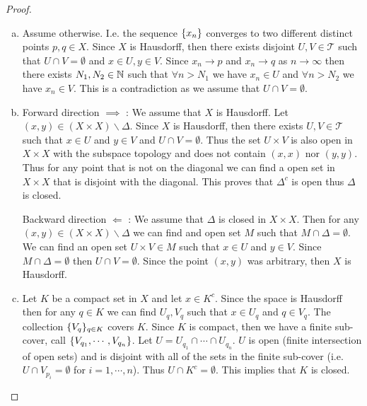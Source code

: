 \begin{proof}
	\begin{enumerate}[(a)]
		\item Assume otherwise. I.e. the sequence $ \{x_n\} $ converges to two different distinct points $ p,q \in X $. Since $ X $ is Hausdorff, then there exists disjoint $ U,V \in \mathcal{T} $ such that $ U\cap V = \emptyset $ and $ x \in U, y\in V $. Since $ x_n \to p $ and $ x_n \to q $ as $ n\to \infty $ then there exists $ N_1,N_2 \in \mathbb{N} $ such that $ \forall n > N_1 $ we have $ x_n \in U $ and $ \forall n > N_2 $ we have $ x_n \in V $. This is a contradiction as we assume that $ U\cap V = \emptyset $.
		
		\item Forward direction $ \boxed{\implies} $ : We assume that $ X $ is Hausdorff. Let $ (x,y) \in (X\times X) \backslash \Delta $. Since $ X $  is Hausdorff, then there exists $ U,V \in \mathcal{T} $ such that $ x \in U $ and $ y \in V $ and $ U\cap V = \emptyset $. Thus the set $ U\times V $ is also open in $ X\times X $  with the subspace topology and does not contain $ (x,x) $ nor $ (y,y) $. Thus for any point that is not on the diagonal we can find a open set in $ X\times X $ that is disjoint with the diagonal. This proves that $ \Delta^c $ is open thus $ \Delta  $ is closed.
		
		\noindent Backward direction $ \boxed{\Longleftarrow} $ : We assume that $ \Delta  $ is closed in $ X\times X $. Then for any $ (x,y) \in (X\times X) \backslash \Delta  $ we can find and open set $ M $ such that $ M\cap \Delta = \emptyset $. We can find an open set $ U\times V \in M $ such that $ x \in U $ and $ y \in V $. Since $ M \cap \Delta = \emptyset $ then $ U \cap V = \emptyset $. Since the point $ (x,y) $ was arbitrary, then $ X $ is Hausdorff.
		
		\item Let $ K $ be a compact set in $ X $ and let $ x \in K^c $. Since the space is Hausdorff then for any $ q \in K $ we can find $ U_q, V_q $ such that $ x \in U_q $ and $ q \in V_q $. The collection $ \{V_q\}_{q\in K} $ covers $ K $. Since $ K $ is compact, then we have a finite sub-cover, call $ \{V_{q_1},\cdots,V_{q_n}\} $. Let $ U = U_{q_1} \cap \cdots\cap U_{q_n} $. $ U $ is open (finite intersection of open sets) and is disjoint with all of the sets in the finite sub-cover (i.e. $ U \cap V_{p_i} = \emptyset $ for $ i=1,\cdots,n $). Thus $ U \cap K^c = \emptyset $. This implies that $K$ is closed.
	\end{enumerate}
	
\end{proof}


